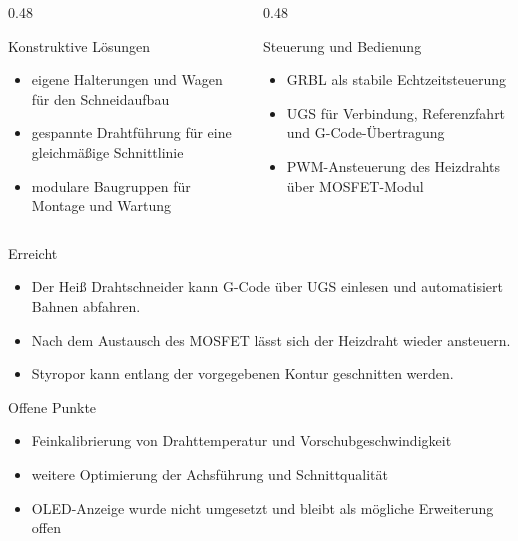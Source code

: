 {
  \begin{columns}[T]
    \begin{column}{0.48\textwidth}
      \begin{block}{Konstruktive Lösungen}
        \begin{itemize}
          \item eigene Halterungen und Wagen für den Schneidaufbau
          \item gespannte Drahtführung für eine gleichmäßige Schnittlinie
          \item modulare Baugruppen für Montage und Wartung
        \end{itemize}
      \end{block}
    \end{column}
    \begin{column}{0.48\textwidth}
      \begin{block}{Steuerung und Bedienung}
        \begin{itemize}
          \item GRBL als stabile Echtzeitsteuerung
          \item UGS für Verbindung, Referenzfahrt und G-Code-Übertragung
          \item PWM-Ansteuerung des Heizdrahts über MOSFET-Modul
        \end{itemize}
      \end{block}
    \end{column}
  \end{columns}
}


{
  \begin{block}{Erreicht}
    \begin{itemize}
      \item Der Heiß Drahtschneider kann G-Code über UGS einlesen und automatisiert Bahnen abfahren.
      \item Nach dem Austausch des MOSFET lässt sich der Heizdraht wieder ansteuern.
      \item Styropor kann entlang der vorgegebenen Kontur geschnitten werden.
    \end{itemize}
  \end{block}

  \vspace{0.25cm}
  \begin{block}{Offene Punkte}
    \begin{itemize}
      \item Feinkalibrierung von Drahttemperatur und Vorschubgeschwindigkeit
      \item weitere Optimierung der Achsführung und Schnittqualität
      \item OLED-Anzeige wurde nicht umgesetzt und bleibt als mögliche Erweiterung offen
    \end{itemize}
  \end{block}
}

